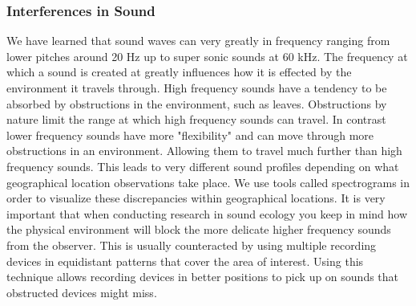 \subsubsection{Interferences in Sound}
We have learned that sound waves can very greatly in frequency ranging from lower pitches around 20 Hz up to super sonic sounds at 60 kHz. The frequency at which a sound is created at greatly influences how it is effected by the environment it travels through. High frequency sounds have a tendency to be absorbed by obstructions in the environment, such as leaves. Obstructions by nature limit the range at which high frequency sounds can travel. In contrast lower frequency sounds have more "flexibility" and can move through more obstructions in an environment. Allowing them to travel much further than high frequency sounds. This leads to very different sound profiles depending on what geographical location observations take place. We use tools called spectrograms in order to visualize these discrepancies within geographical locations. It is very important that when conducting research in sound ecology you keep in mind how the physical environment will block the more delicate higher frequency sounds from the observer. This is usually counteracted by using multiple recording devices in equidistant patterns that cover the area of interest. Using this technique allows recording devices in better positions to pick up on sounds that obstructed devices might miss.


